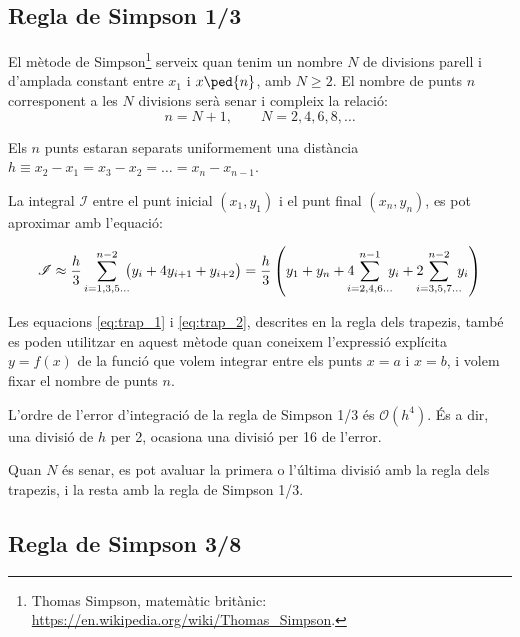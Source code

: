\subsection{Regla de Simpson 1/3}

El mètode de Simpson\footnote{Thomas Simpson, matemàtic britànic: \href{https://en.wikipedia.org/wiki/Thomas_Simpson}{https:/\!\!/en.wikipedia.org/wiki/Thomas\_Simpson}.} serveix quan tenim un nombre  $N$ de divisions parell i d'amplada constant entre $x_1$ i $x\ped{n}$, amb $N \geq 2$.  El nombre de punts $n$ corresponent a les  $N$ divisions serà senar i compleix la relació:
\begin{equation}
	n = N+1, \qquad N = 2, 4, 6, 8, \dots
\end{equation}

Els $n$ punts estaran separats uniformement una distància $h \equiv x_2-x_1 = x_3-x_2 = \dots = x_n-x_{n-1}$.

La integral $\mathscr{I}$ entre el punt inicial $(x_1, y_1)$ i el punt final $(x_n, y_n)$, es pot aproximar amb l'equació:

 \begin{equation}\label{eq:simp_1_3}
   \mathscr{I} \approx  \frac{h}{3} \sum_{i=1,3,5\dots}^{n-2} \hspace{-0.5em} \big( y_i + 4 y_{i+1} + y_{i+2} \big) =
   \frac{h}{3} \left( y_1 + y_n + 4 \hspace{-0.7em} \sum_{i=2,4,6\dots}^{n-1} \hspace{-0.5em} y_i +
   2 \hspace{-0.7em} \sum_{i=3,5,7\dots}^{n-2} \hspace{-0.5em} y_i \right)
 \end{equation}

Les equacions \eqref{eq:trap_1} i \eqref{eq:trap_2}, descrites en la regla dels trapezis, també es poden utilitzar en aquest mètode quan  coneixem l'expressió explícita $y=f(x)$ de la funció que volem integrar entre els punts $x=a$ i $x=b$, i volem fixar el nombre de punts $n$.

L'ordre de l'error d'integració de la regla de Simpson 1/3 és $\mathscr{O}(h^4)$. És a dir, una divisió de $h$ per 2, ocasiona una divisió per 16 de l'error.

Quan $N$ és senar, es pot avaluar la primera o l'última divisió amb la  regla dels trapezis, i la resta amb la regla de Simpson 1/3.

 \subsection{Regla de Simpson 3/8}

